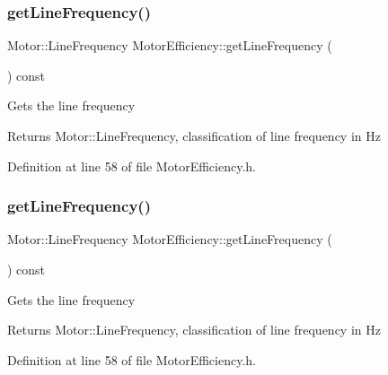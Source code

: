 \mbox{\label{class_motor_efficiency_a3cc0ed606154a04d035399e05d1cb02a}} 
\subsubsection{\texorpdfstring{get\+Line\+Frequency()}{getLineFrequency()}\hspace{0.1cm}{\footnotesize\ttfamily [2/3]}}
{\footnotesize\ttfamily Motor\+::\+Line\+Frequency Motor\+Efficiency\+::get\+Line\+Frequency (\begin{DoxyParamCaption}{ }\end{DoxyParamCaption}) const\hspace{0.3cm}{\ttfamily [inline]}}

Gets the line frequency \begin{DoxyReturn}{Returns}
Motor\+::\+Line\+Frequency, classification of line frequency in Hz 
\end{DoxyReturn}


Definition at line 58 of file Motor\+Efficiency.\+h.

\mbox{\label{class_motor_efficiency_a3cc0ed606154a04d035399e05d1cb02a}} 
\subsubsection{\texorpdfstring{get\+Line\+Frequency()}{getLineFrequency()}\hspace{0.1cm}{\footnotesize\ttfamily [3/3]}}
{\footnotesize\ttfamily Motor\+::\+Line\+Frequency Motor\+Efficiency\+::get\+Line\+Frequency (\begin{DoxyParamCaption}{ }\end{DoxyParamCaption}) const\hspace{0.3cm}{\ttfamily [inline]}}

Gets the line frequency \begin{DoxyReturn}{Returns}
Motor\+::\+Line\+Frequency, classification of line frequency in Hz 
\end{DoxyReturn}


Definition at line 58 of file Motor\+Efficiency.\+h.

